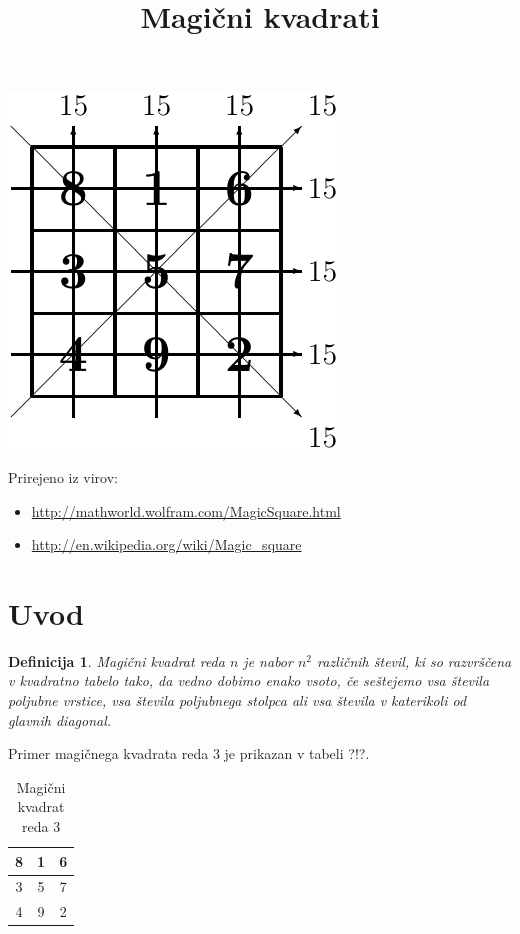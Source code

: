\documentclass[a4paper,12pt]{article}
\title{Magični kvadrati}
\date{}
\author{}
\newtheorem{definicija}[izrek]{Definicija}
\begin{document}
\maketitle

\begin{center}
   \includegraphics{slika.pdf}
\end{center}


Prirejeno iz virov:

\begin{itemize}
   \item \url{http://mathworld.wolfram.com/MagicSquare.html}
   \item \url{http://en.wikipedia.org/wiki/Magic_square}
\end{itemize}


\tableofcontents

\newpage

\section{Uvod}

\begin{definicija}
   \emph{Magični kvadrat} reda $n$ je nabor $n^2$ različnih števil,
   ki so razvrščena v kvadratno tabelo tako, da vedno dobimo enako vsoto,
   če seštejemo vsa števila poljubne vrstice, vsa števila poljubnega
   stolpca ali vsa števila v katerikoli od glavnih diagonal.
\end{definicija}

Primer magičnega kvadrata reda 3 je prikazan v tabeli ?!?.


\begin{table}
   \caption{Magični kvadrat reda 3}
   \label{table:mag3}
   \centering
	\begin{tabular}{|c|c|c|}
      \hline
	8 & 1 & 6 \\\hline
3 & 5 & 7 \\\hline
4 & 9 & 2 \\\hline
\end{tabular}
\end{table}
\end{document}
